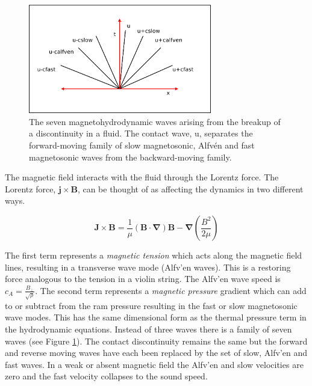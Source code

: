\begin{figure}[t]
\centering
\includegraphics[width=8cm]{MHDSevenWaves}
\caption{
The seven magnetohydrodynamic waves arising from the breakup of a discontinuity in a fluid. The contact wave, u, separates the forward-moving family of slow magnetosonic, Alfv\'en and fast magnetosonic waves from the backward-moving family.
}
\label{fig:MHDSevenWaves} %
\end{figure}

The magnetic field interacts with the fluid through the Lorentz force.
The Lorentz force, $\mathbf{j}\times \mathbf{B}$, 
can be thought of as affecting the dynamics in two different ways.

\begin{equation}
 \mathbf{J}\times \mathbf{B}= \frac{1}{\mu} \left( \mathbf{B} \cdot \boldsymbol{\nabla} \right) \mathbf{B} - \boldsymbol \nabla \left( \frac{B^2}{2 \mu}\right)
\end{equation}

The first term represents a \emph{magnetic tension} which acts along the
magnetic field lines, resulting in a transverse wave mode (Alfv\a'{e}n waves).
This is a restoring force analogous to the tension in a violin string. The
Alfv\a'{e}n wave speed is $c_A = \frac{  B_{\perp} }{ \sqrt{\rho}}$.
The second term represents a \emph{magnetic pressure} gradient which can add to or subtract from the ram pressure resulting in the fast or slow magnetosonic wave modes. This has the same dimensional form as the thermal pressure term in the hydrodynamic equations.
Instead of three waves there is a family of seven waves (see Figure \ref{fig:MHDSevenWaves}).
The contact discontinuity remains the same but the forward and reverse moving waves have each been replaced by the set of slow, Alfv\a'{e}n and fast waves.
In a weak or absent magnetic field the Alfv\a'{e}n and slow velocities are zero and the fast velocity collapses to the sound speed.


